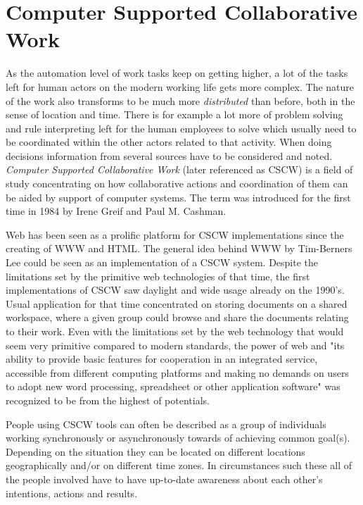\section{Computer Supported Collaborative Work}



As the automation level of work tasks keep on getting higher, a lot of the tasks left for human actors on the modern working life gets more complex. The nature of the work also transforms to be much more \textit{distributed} than before, both in the sense of location and time. There is for example a lot more of problem solving and rule interpreting left for the human employees to solve which usually need to be coordinated within the other actors related to that activity. When doing decisions information from several sources have to be considered and noted. \textit{Computer Supported Collaborative Work} (later referenced as CSCW) is a field of study concentrating on how collaborative actions and coordination of them can be aided by support of computer systems. The term was introduced for the first time in 1984 by Irene Greif and Paul M. Cashman. \cite{carstensen_computer_1999}

Web has been seen as a prolific platform for CSCW implementations since the creating of WWW and HTML. The general idea behind WWW by Tim-Berners Lee could be seen as an implementation of a CSCW system. Despite the limitations set by the primitive web technologies of that time, the first implementations of CSCW saw daylight and wide usage already on the 1990's. Usual application for that time concentrated on storing documents on a shared workspace, where a given group could browse and share the documents relating to their work. Even with the limitations set by the web technology that would seem very primitive compared to modern standards, the power of web and "its ability to provide basic features for cooperation in an integrated service, accessible from different computing platforms and making no demands on users to adopt new word processing, spreadsheet or other application software" was recognized to be from the highest of potentials. \cite{bentley_basic_1997}

People using CSCW tools can often be described as a group of individuals working synchronously or asynchronously towards of achieving common goal(s). Depending on the situation they can be located on different locations geographically and/or on different time zones. In circumstances such these all of the people involved have to have up-to-date awareness about each other's intentions, actions and results. \cite{carroll_notification_2003}

